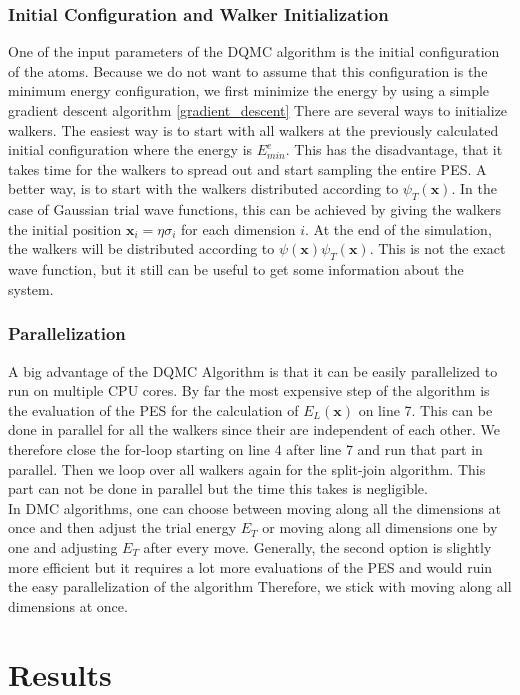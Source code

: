 \documentclass [12pt]{report}
\begin{document}
\subsection{Initial Configuration and Walker Initialization}
One of the input parameters of the DQMC algorithm is the initial configuration of the atoms. Because we do not want to assume that this configuration is the minimum energy configuration, we first minimize the energy by using a simple gradient descent algorithm \ref{gradient_descent}
There are several ways to initialize walkers. The easiest way is to start with all walkers at the previously calculated initial configuration where the energy is $E^e_{min}$. This has the disadvantage, that it takes time for the walkers to spread out and start sampling the entire PES. A better way, is to start with the walkers distributed according to $\psi_T(\bm{x})$. In the case of Gaussian trial wave functions, this can be achieved by giving the walkers the initial position $\bm{x}_i = \eta \sigma_i$ for each dimension $i$.
At the end of the simulation, the walkers will be distributed according to $\psi(\bm{x})\psi_T(\bm{x})$. This is not the exact wave function, but it still can be useful to get some information about the system.
\subsection{Parallelization}
A big advantage of the DQMC Algorithm is that it can be easily parallelized to run on multiple CPU cores. By far the most expensive step of the algorithm is the evaluation of the PES for the calculation of $E_L(\bm{x})$ on line 7. This can be done in parallel for all the walkers since their are independent of each other. We therefore close the for-loop starting on line 4 after line 7 and run that part in parallel. Then we loop over all walkers again for the split-join algorithm. This part can not be done in parallel but the time this takes is negligible. \\
In DMC algorithms, one can choose between moving along all the dimensions at once and then adjust the trial energy $E_T$ or moving along all dimensions one by one and adjusting $E_T$ after every move. Generally, the second option is slightly more efficient but it requires a lot more evaluations of the PES and would ruin the easy parallelization of the algorithm Therefore, we stick with moving along all dimensions at once. 

\chapter{Results}
\end{document}
